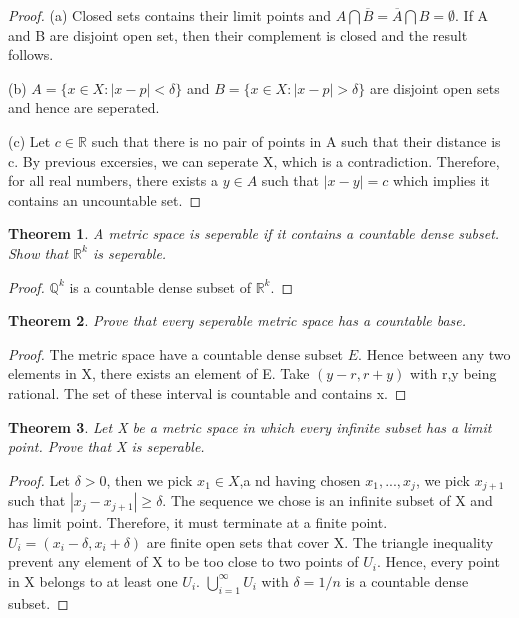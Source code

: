 \documentclass{article}
\theoremstyle{plain}
\newtheorem{theorem}{Theorem}
\theoremstyle{definition}
\begin{document}
\begin{proof}
	(a) Closed sets contains their limit points and $A \bigcap \overline{B} = \overline{A} \bigcap B = \emptyset$. If A and B are disjoint open set, then their complement is closed and the result follows.

	(b) $A = \{ x \in X: |x - p| < \delta \}$ and $B = \{x \in X: |x - p| > \delta \}$ are disjoint open sets and hence are seperated.

	(c) Let $c \in \mathbb{R}$ such that there is no pair of points in A such that their distance is c. By previous excersies, we can seperate X, which is a contradiction. Therefore, for all real numbers, there exists a $y \in A$ such that $|x - y| = c$ which implies it contains an uncountable set.
\end{proof}

\begin{theorem}
	A metric space is seperable if it contains a countable dense subset. Show that $\mathbb{R}^{k}$ is seperable.
\end{theorem}

\begin{proof}
	$\mathbb{Q}^{k}$ is a countable dense subset of $\mathbb{R}^{k}$.
\end{proof}

\begin{theorem}
	Prove that every seperable metric space has a countable base.
\end{theorem}
\begin{proof}
	The metric space have a countable dense subset $E$. Hence between any two elements in X, there exists an element of E. Take $(y - r, r + y)$ with r,y being rational. The set of these interval is countable and contains x.  
\end{proof}
\begin{theorem}
Let X be a metric space in which every infinite subset has a limit point. Prove that X is seperable.
\end{theorem}

\begin{proof}
	Let $\delta > 0$, then we pick $x_{1} \in X$,a nd having chosen $x_{1},...,x_{j}$, we pick $x_{j + 1}$ such that $|x_{j} - x_{j + 1}| \geq \delta$. The sequence we chose is an infinite subset of X and has limit point. Therefore, it must terminate at a finite point. $U_{i} = (x_{i} - \delta, x_{i} + \delta)$ are finite open sets that cover X. The triangle inequality prevent any element of X to be too close to two points of $U_{i}$. Hence, every point in X belongs to at least one $U_{i}$. $\bigcup_{i = 1}^{\infty} U_{i}$ with $\delta = 1/n$ is a countable dense subset.
\end{proof}
\end{document}
